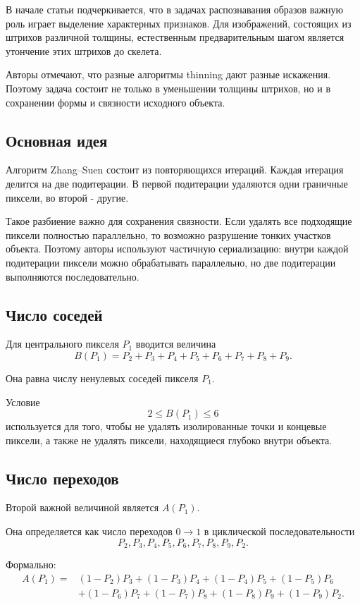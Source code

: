 \documentclass[12pt,a4paper]{article}
\begin{document}
	В начале статьи подчеркивается, что в задачах распознавания образов важную роль играет выделение характерных признаков. Для изображений, состоящих из штрихов различной толщины, естественным предварительным шагом является утончение этих штрихов до скелета.
	
	Авторы отмечают, что разные алгоритмы thinning дают разные искажения. Поэтому задача состоит не только в уменьшении толщины штрихов, но и в сохранении формы и связности исходного объекта.
	
	\subsection{Основная идея}
	
	Алгоритм Zhang--Suen состоит из повторяющихся итераций. Каждая итерация делится на две подитерации. В первой подитерации удаляются одни граничные пиксели, во второй - другие.
	
	Такое разбиение важно для сохранения связности. Если удалять все подходящие пиксели полностью параллельно, то возможно разрушение тонких участков объекта. Поэтому авторы используют частичную сериализацию: внутри каждой подитерации пиксели можно обрабатывать параллельно, но две подитерации выполняются последовательно.
	
	\subsection{Число соседей}
	
	Для центрального пикселя $P_1$ вводится величина
	\[
	B(P_1)=P_2+P_3+P_4+P_5+P_6+P_7+P_8+P_9.
	\]
	
	Она равна числу ненулевых соседей пикселя $P_1$.
	
	Условие
	\[
	2 \le B(P_1) \le 6
	\]
	используется для того, чтобы не удалять изолированные точки и концевые пиксели, а также не удалять пиксели, находящиеся глубоко внутри объекта.
	
	\subsection{Число переходов}
	
	Второй важной величиной является $A(P_1)$.
	
	Она определяется как число переходов $0\to1$ в циклической последовательности
	\[
	P_2, P_3, P_4, P_5, P_6, P_7, P_8, P_9, P_2.
	\]
	
	Формально:
	\[
	\begin{aligned}
		A(P_1) ={}&
		(1-P_2)P_3 + (1-P_3)P_4 + (1-P_4)P_5 + (1-P_5)P_6 \\
		&+ (1-P_6)P_7 + (1-P_7)P_8 + (1-P_8)P_9 + (1-P_9)P_2.
	\end{aligned}
	\]
	
\end{document}
